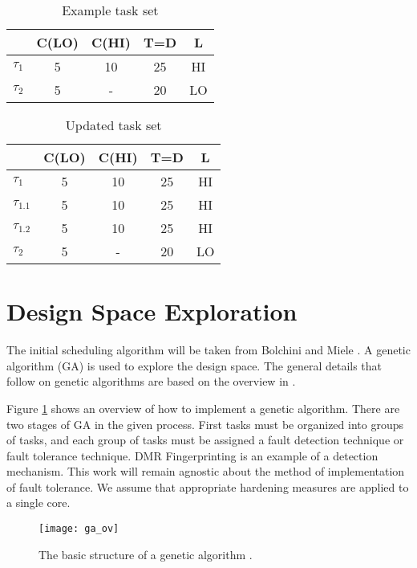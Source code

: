 \begin{table}
\centering
\caption{Example task set}
\begin{tabular}{@{}l|cccc@{}}
\toprule
		& C(LO) & C(HI) & T=D & L 	 \\\bottomrule
$\tau_1$ & 5 & 10 & 25 & HI  \\
$\tau_2$ & 5 & - & 20 & LO  \\
\end{tabular}
\end{table}

\begin{table}
\centering
\caption{Updated task set}
\begin{tabular}{@{}l|cccc@{}}
\toprule
		& C(LO) & C(HI) & T=D & L	 \\\bottomrule
$\tau_1$ & 5 & 10 & 25 & HI  \\
$\tau_{1.1}$ & 5 & 10 & 25 & HI  \\
$\tau_{1.2}$ & 5 & 10 & 25 & HI  \\
$\tau_2$ & 5 & - & 20 & LO  \\
\end{tabular}
\end{table}


\section{Design Space Exploration}

The initial scheduling algorithm will be taken from Bolchini and  Miele \cite{bolchini2013reliability}. A genetic algorithm (GA) is used to explore the design space. The general details that follow on genetic algorithms are based on the overview in \cite{geatbx}.

Figure \ref{f:ga_ov} shows an overview of how to implement a genetic algorithm. There are two stages of GA in the given process. First tasks must be organized into groups of tasks, and each group of tasks must be assigned a fault detection technique or fault tolerance technique. DMR Fingerprinting is an example of a detection mechanism. This work will remain agnostic about the method of implementation of fault tolerance. We assume that appropriate hardening measures are applied to a single core.
 
\begin{figure}[h]
\centering
\texttt{[image: ga\_ov]}
\caption{The basic structure of a genetic algorithm \cite{geatbx}.} 
\label{f:ga_ov}
\end{figure}

